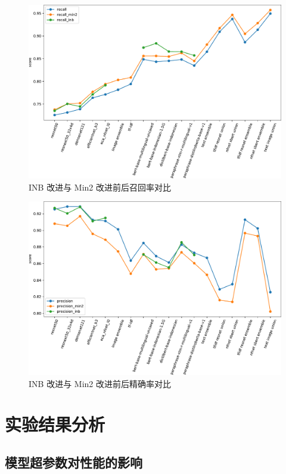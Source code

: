 \documentclass[12pt]{article}
\begin{document}
\begin{figure}[htbp]
  \centering
  \includegraphics[width=14cm]{results_plot_recall_df.pdf}
  \caption{INB 改进与 Min2 改进前后召回率对比}
  \label{fig:results_summary_recall}
\end{figure}

\begin{figure}[htbp]
  \centering
  \includegraphics[width=14cm]{results_plot_precision_df.pdf}
  \caption{INB 改进与 Min2 改进前后精确率对比}
  \label{fig:results_summary_precision}
\end{figure}

\section{实验结果分析}

\subsection{模型超参数对性能的影响}
\end{document}
